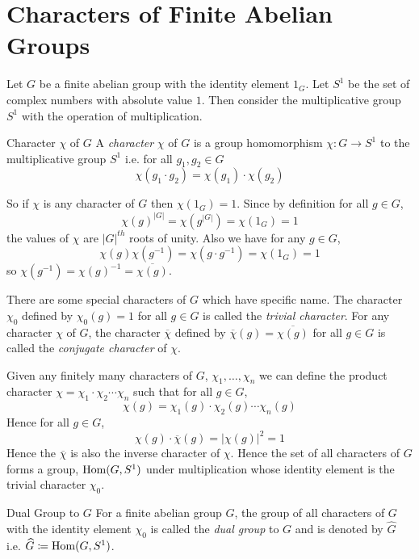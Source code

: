 \section{Characters of Finite Abelian Groups}\label{sec:chars-finite-abelian}
Let $G$ be a finite abelian group with the identity element $1_G$. Let $S^1$ be the set of complex numbers with absolute value $1$. Then consider the multiplicative group $S^1$ with the operation of multiplication.
\begin{Definition}{Character $\chi$ of $G$}{}
  A \emph{character} $\chi$ of $G$ is a group homomorphism $\chi:G\to S^1$ to the multiplicative group $S^1$ i.e. for all $g_1,g_2\in G$ $$\chi(g_1\cdot g_2)=\chi(g_1)\cdot \chi(g_2)$$
\end{Definition}

So if $\chi$ is any character of $G$ then $\chi(1_G)=1$. Since by definition for all $g\in G$, $$\chi(g)^{|G|}=\chi(g^{|G|})=\chi(1_G)=1$$ the values of $\chi$ are $|G|^{th}$ roots of unity. Also we have for any $g\in G$, $$\chi(g)\chi(g^{-1})=\chi(g\cdot g^{-1})=\chi(1_G)=1$$ so $\chi(g^{-1})=\chi(g)^{-1}=\overline{\chi(g)}$.

There are some special characters of $G$ which have specific name. The character $\chi_0$ defined by $\chi_0(g)=1$ for all $g\in G$ is called the \emph{trivial character}. For any character $\chi$ of $G$, the character $\overline{\chi}$ defined by $\overline{\chi}(g)=\overline{\chi(g)}$ for all $g\in G$ is called the \emph{conjugate character} of $\chi$.

Given any finitely many characters of $G$, $\chi_1,\dots, \chi_n$ we can define the product character $\chi=\chi_1\cdot \chi_2\cdots \chi_n$ such that for all $g\in G$, $$\chi(g)=\chi_1(g)\cdot \chi_2(g)\cdots \chi_n(g)$$
Hence for all $g\in G$, $$\chi(g)\cdot \overline{\chi}(g)=|\chi(g)|^2=1$$Hence the $\overline{\chi}$ is also the inverse character of $\chi$. Hence the set of all characters of $G$ forms a group, $\operatorname{Hom}(G,S^1)$ under multiplication whose identity element is the trivial character $\chi_0$.
\begin{Definition}{Dual Group to $G$}{}
  For a finite abelian group $G$, the group of all characters of $G$ with the identity element $\chi_0$ is called the \emph{dual group} to $G$ and is denoted by $\widehat{G}$ i.e. $\widehat{G}\coloneqq \operatorname{Hom}(G,S^1)$.
\end{Definition}

